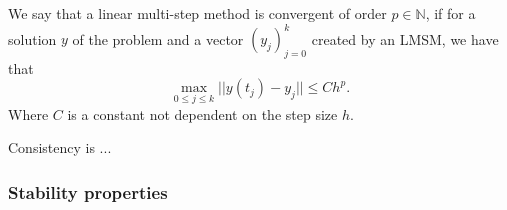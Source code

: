 	\begin{frame}
		\vfill
		\begin{definition} \label{def: LMSM convergence}
			We say that a linear multi-step method is convergent of order $p \in \mathbb{N}$, if for a solution $y$ of the problem and a vector $(y_j)_{j=0}^k$ created by an LMSM, we have that
			\begin{displaymath}
				\max_{0 \leq j \leq k} ||y(t_j) - y_j|| \leq Ch^p.
			\end{displaymath}
			Where $C$ is a constant not dependent on the step size $h$.
		\end{definition}
		
		Consistency is ...
		
		\vfill
	\end{frame}
	
	
	\subsubsection{Stability properties}
	
